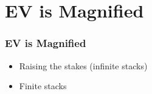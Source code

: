 \documentclass{beamer}
\begin{document}
\section{EV is Magnified}
\begin{frame}
\frametitle{EV is Magnified}
\begin{itemize}
\item Raising the stakes (infinite stacks) \pause
\item Finite stacks
\end{itemize}
\end{frame}
\end{document}
